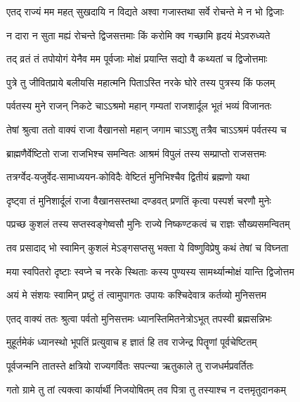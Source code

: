 \twolineshloka
{एतद् राज्यं मम महत् सुखदायि न विद्यते}
{अश्वा गजास्तथा सर्वे रोचन्ते मे न भो द्विजाः}%

\twolineshloka
{न दारा न सुता मह्यं रोचन्ते द्विजसत्तमाः}
{किं करोमि क्व गच्छामि हृदयं मेऽवरुध्यते}%

\twolineshloka
{तद् व्रतं तं तपोयोगं येनैव मम पूर्वजाः}
{मोक्षं प्रयान्ति सद्यो वै कथ्यतां च द्विजोत्तमाः}%

\twolineshloka
{पुत्रे तु जीवितप्राये बलीयसि महात्मनि}
{पिताऽस्ति नरके घोरे तस्य पुत्रस्य किं फलम्}%


\twolineshloka
{पर्वतस्य मुने राजन् निकटे चाऽऽश्रमो महान्}
{गम्यतां राजशार्दूल भूतं भव्यं विजानतः}%

\twolineshloka
{तेषां श्रुत्वा ततो वाक्यं राजा वैखानसो महान्}
{जगाम चाऽऽशु तत्रैव चाऽऽश्रमं पर्वतस्य च}%

\twolineshloka
{ब्राह्मणैर्वेष्टितो राजा राजभिश्च समन्वितः}
{आश्रमं विपुलं तस्य सम्प्राप्तो राजसत्तमः}%

\twolineshloka
{तत्रर्ग्वेद-यजुर्वेद-सामाध्ययन-कोविदैः}
{वेष्टितं मुनिभिश्चैव द्वितीयं ब्रह्मणो यथा}%

\twolineshloka
{दृष्ट्वा तं मुनिशार्दूलं राजा वैखानसस्तथा}
{दण्डवत् प्रणतिं कृत्वा पस्पर्श चरणौ मुनेः}%

\twolineshloka
{पप्रच्छ कुशलं तस्य सप्तस्वङ्गेष्वसौ मुनिः}
{राज्ये निष्कण्टकत्वं च राज्ञः सौख्यसमन्वितम्}%


\twolineshloka
{तव प्रसादाद् भो स्वामिन् कुशलं मेऽङ्गसप्तसु}
{भक्ता ये विष्णुविप्रेषु कथं तेषां च विघ्नता}%

\twolineshloka
{मया स्वपितरो दृष्टाः स्वप्ने च नरके स्थिताः}
{कस्य पुण्यस्य सामर्थ्यान्मोक्षं यान्ति द्विजोत्तम}%

\twolineshloka
{अयं मे संशयः स्वामिन् प्रष्टुं तं त्वामुपागतः}
{उपायः कश्चिदेवात्र कर्तव्यो मुनिसत्तम}%

\twolineshloka
{एतद् वाक्यं ततः श्रुत्वा पर्वतो मुनिसत्तमः}
{ध्यानस्तिमितनेत्रोऽभूत् तपस्वी ब्रह्मसन्निभः}%

\twolineshloka
{मुहूर्तमेकं ध्यानस्थो भूपतिं प्रत्युवाच ह}
{ज्ञातं हि तव राजेन्द्र पितॄणां पूर्वचेष्टितम्}%

\twolineshloka
{पूर्वजन्मनि तातस्ते क्षत्रियो राज्यगर्वितः}
{सपत्न्या ऋतुकाले तु राजधर्मप्रवर्तितः}%

\twolineshloka
{गतो ग्रामे तु तां त्यक्त्वा कार्यार्थी निजयोषितम्}
{तव पित्रा तु तस्याश्च न दत्तमृतुदानकम्}%

